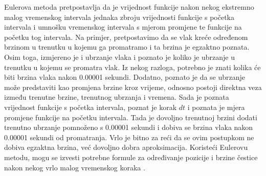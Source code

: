 \documentclass{foi}
\begin{document}
Eulerova metoda pretpostavlja da je vrijednost funkcije nakon nekog ekstremno malog vremenskog intervala jednaka zbroju vrijednosti funkcije s početka intervala i umnošku vremenskog intervala s mjerom promjene te funkcije  na početku tog intervala. Na primjer, pretpostavimo da se vlak kreće određenom brzinom u trenutku u kojemu ga promatramo i ta brzina je egzaktno poznata. Osim toga, izmjereno je i ubrzanje vlaka i poznato je koliko je ubrzanje u trenutku u kojemu se promatra vlak. Iz nekog razloga, potrebno je znati kolika će biti brzina vlaka nakon 0.00001 sekundi. Dodatno, poznato je da se ubrzanje može predstaviti kao promjena brzine kroz vrijeme, odnosno postoji direktna veza između trenutne brzine, trenutnog ubrzanja i vremena. Sada je poznata vrijednost funkcije s početka intervala, poznat je korak $dt$ i poznata je mjera promjene funkcije na početku intervala. Tada je dovoljno trenutnoj brzini dodati trenutno ubrzanje pomnoženo s 0.00001 sekundi i dobiva se brzina vlaka nakon 0.00001 sekundi od promatranja. Vrlo je bitno za reći da se ovim postupkom ne dobiva egzaktna brzina, već dovoljno dobra aproksimacija. Koristeći Eulerovu metodu, mogu se izvesti potrebne formule za određivanje pozicije i brzine čestice nakon nekog vrlo malog vremenskog koraka \parencite{EulersMethod2013}.
\end{document}
